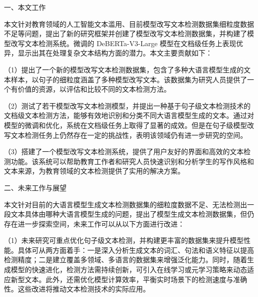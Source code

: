 %
%
%
%

\begin{conclusion}

一、本文工作

本文针对教育领域的人工智能文本滥用、目前模型改写文本检测数据集细粒度数据不足等问题，提出了新的研究框架并创建了模型改写文本检测数据集，并构建了模型改写文本检测系统。微调的 DeBERTa-V3-Large 模型在文档级任务上表现优异，显示出其在处理复杂文本结构方面的潜力。本文主要贡献如下：

（1）提出了一个新的模型改写文本检测数据集，包含了多种大语言模型生成的文本样本，以句子的细粒度涵盖了多种模型改写文本。该数据集为研究人员提供了一个有价值的资源，以评估和比较不同的文本检测方法。

（2）测试了若干模型改写文本检测模型，并提出一种基于句子级文本检测技术的文档级文本检测方法，能够有效地识别和分类不同大语言模型生成的文本。通过对模型的微调和优化，系统在文档级任务上取得了显著的成效。但是在句子级模型改写文本检测任务上仍然存在一定的挑战性，表明该领域仍有进一步研究的空间。

（3）搭建了一个模型改写文本检测系统，提供了用户友好的界面和高效的文本检测功能。该系统可以帮助教育工作者和研究人员快速识别和分析学生的写作风格和文本来源，为教育领域的文本检测提供了实用的解决方案。

二、未来工作与展望

本文针对目前的大语言模型生成文本检测数据集的细粒度数据不足、无法检测出一段文本具体由哪种大语言模型生成的问题，提出了模型生成文本检测数据集，但仍存在进一步探索空间，未来工作可以从以下方面进行改进：

（1）未来研究可重点优化句子级文本检测，并构建更丰富的数据集来提升模型性能。具体可从两方面着手：一是深入分析生成文本的词汇、句法和语义特征以提高检测精度；二是建立覆盖多领域、多语言的数据集来增强泛化能力。同时，随着生成模型的快速进化，检测方法需持续创新，可引入在线学习或元学习策略来动态适应新型文本。此外，还需优化模型计算效率，平衡实时场景下的检测速度与准确性。这些改进将推动文本检测技术的实际应用。


\end{conclusion}
